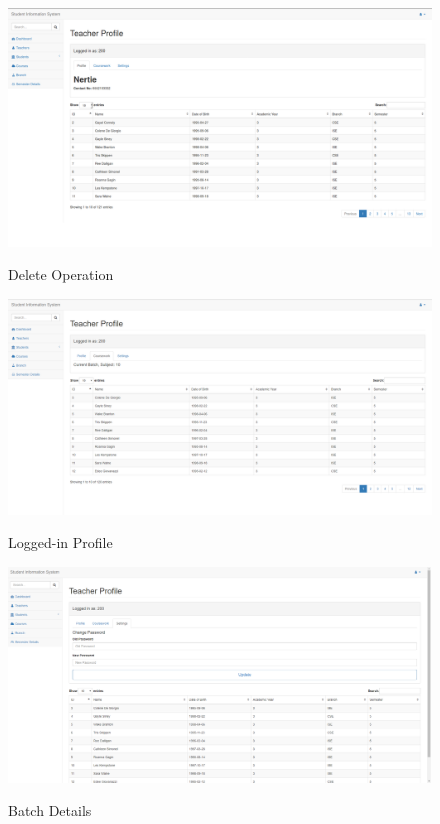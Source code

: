 \begin{figure}[H]
\centering
\caption{Delete Operation}
\includegraphics[width=\textwidth,height=\textheight,keepaspectratio]{./snaps/12.png}
\\[0.2in]

\end{figure}

\begin{figure}[H]
\centering
\caption{Logged-in Profile}
\includegraphics[width=\textwidth,height=\textheight,keepaspectratio]{./snaps/13.png}
\\[0.2in]

\end{figure}

\begin{figure}[H]
\centering
\caption{Batch Details}
\includegraphics[width=\textwidth,height=\textheight,keepaspectratio]{./snaps/14.png}
\\[0.2in]

\end{figure}